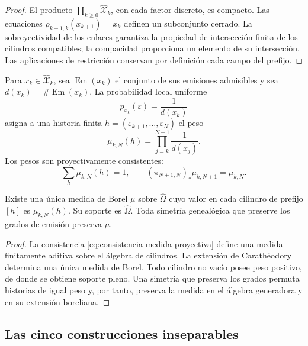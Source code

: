 \begin{proof}
El producto \(\prod_{k\geq0}\widehat{\mathcal X}_k\), con cada factor
discreto, es compacto. Las ecuaciones
\(\rho_{k+1,k}(x_{k+1})=x_k\) definen un subconjunto cerrado. La
sobreyectividad de los enlaces garantiza la propiedad de intersección finita
de los cilindros compatibles; la compacidad proporciona un elemento de su
intersección. Las aplicaciones de restricción conservan por definición cada
campo del prefijo.
\end{proof}

Para \(x_k\in\widehat{\mathcal X}_k\), sea
\(\operatorname{Em}(x_k)\) el conjunto de sus emisiones admisibles y sea
\(d(x_k)=\#\operatorname{Em}(x_k)\). La probabilidad local uniforme
\begin{equation}
 p_{x_k}(\varepsilon)=\frac1{d(x_k)}
 \label{eq:probabilidad-local-configuracion}
\end{equation}
asigna a una historia finita
\(h=(\varepsilon_{k+1},\ldots,\varepsilon_N)\) el peso
\begin{equation}
 \mu_{k,N}(h)=\prod_{j=k}^{N-1}\frac1{d(x_j)}.
 \label{eq:peso-historia-finita}
\end{equation}
Los pesos son proyectivamente consistentes:
\begin{equation}
 \sum_h\mu_{k,N}(h)=1,
 \qquad
 (\pi_{N+1,N})_*\mu_{k,N+1}=\mu_{k,N}.
 \label{eq:consistencia-medida-proyectiva}
\end{equation}

\begin{theorem}
\label{thm:medida-genealogica}
Existe una única medida de Borel \(\mu\) sobre \(\widehat\Omega\) cuyo valor
en cada cilindro de prefijo \([h]\) es \(\mu_{k,N}(h)\). Su soporte es
\(\widehat\Omega\). Toda simetría genealógica que preserve los grados de
emisión preserva \(\mu\).
\end{theorem}

\begin{proof}
La consistencia \eqref{eq:consistencia-medida-proyectiva} define una medida
finitamente aditiva sobre el álgebra de cilindros. La extensión de
Carathéodory determina una única medida de Borel. Todo cilindro no vacío
posee peso positivo, de donde se obtiene soporte pleno. Una simetría que
preserva los grados permuta historias de igual peso y, por tanto, preserva la
medida en el álgebra generadora y en su extensión boreliana.
\end{proof}

\subsection{Las cinco construcciones inseparables}


